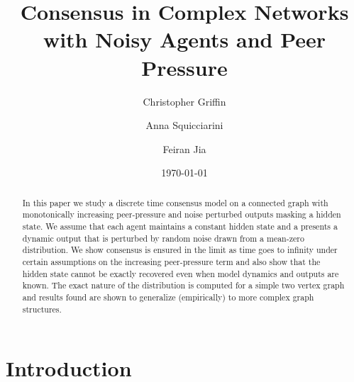 \documentclass[aps,superscriptaddress,floatfix,amsmath,amssymb]{revtex4-2}
\begin{document}
\title{Consensus in Complex Networks with Noisy Agents and Peer Pressure}

\author{Christopher Griffin}
\author{Anna Squicciarini}
\author{Feiran Jia}


\date{\today}%


\begin{abstract}
In this paper we study a discrete time consensus model on a connected graph with  monotonically increasing peer-pressure and noise perturbed outputs masking a hidden state. We assume that each agent maintains a constant hidden state and a presents a dynamic output that is perturbed by random noise drawn from a mean-zero distribution. We show consensus is ensured in the limit as time goes to infinity under certain assumptions on the increasing peer-pressure term and also show that the hidden state cannot be exactly recovered even when model dynamics and outputs are known. The exact nature of the distribution is computed for a simple two vertex graph and results found are shown to generalize (empirically) to more complex graph structures.
\end{abstract}

\maketitle

\section{Introduction}
\end{document}
